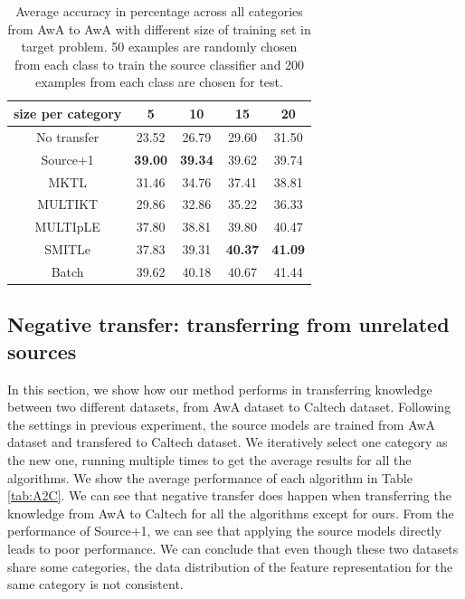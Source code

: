 \begin{table}[h]
  \centering
  \caption{Average accuracy in percentage across all categories from AwA to AwA with different size of training set in target problem. 50 examples are randomly chosen from each class to train the source classifier and 200 examples from each class are chosen for test.}
    \begin{tabular}{ccccc}
    \toprule
     size per category    & 5     & 10    & 15    & 20 \\
    \midrule
    No transfer &         23.52  &         26.79  &         29.60  &         31.50  \\
    Source+1    &         \textbf{ 39.00 } &         \textbf{ 39.34 } &         39.62 &         39.74  \\
    MKTL        &         31.46  &         34.76  &         37.41  &         38.81  \\
    MULTIKT     &         29.86  &         32.86  &         35.22  &         36.33  \\
    MULTIpLE    &         37.80  &         38.81  &         39.80  &         40.47  \\
    SMITLe        &        37.83  &         { 39.31 } &         \textbf{ 40.37 } &         \textbf{41.09} \\
        \midrule
    Batch       &         39.62  &         40.18  &         40.67  &         41.44  \\
    \bottomrule
    \end{tabular}%
  \label{tab:A2A}%
\end{table}%



\subsection{Negative transfer: transferring from unrelated sources}
In this section, we show how our method performs in transferring knowledge between two different datasets, from AwA dataset to Caltech dataset. Following the settings in previous experiment, the source models are trained from AwA dataset and transfered to Caltech dataset. We iteratively select one category as the new one, running multiple times to get the average results for all the algorithms. We show the average performance of each algorithm in Table \ref{tab:A2C}. We can see that negative transfer does happen when transferring the knowledge from AwA to Caltech for all the algorithms except for ours. From the performance of Source+1, we can see that applying the source models directly leads to poor performance. We can conclude that even though these two datasets share some categories, the data distribution of the feature representation for the same category is not consistent. 

